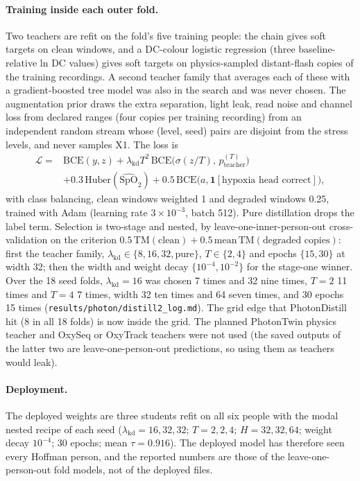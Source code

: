 \paragraph{Training inside each outer fold.} Two teachers are refit on the fold's five training people: the chain gives soft targets on clean windows, and a DC-colour logistic regression (three baseline-relative ln DC values) gives soft targets on physics-sampled distant-flash copies of the training recordings. A second teacher family that averages each of these with a gradient-boosted tree model was also in the search and was never chosen. The augmentation prior draws the extra separation, light leak, read noise and channel loss from declared ranges (four copies per training recording) from an independent random stream whose (level, seed) pairs are disjoint from the stress levels, and never samples X1. The loss is
\begin{equation}
\begin{split}
\mathcal L={}&\mathrm{BCE}(y,z)+\lambda_{\mathrm{kd}}T^2\,\mathrm{BCE}\big(\sigma(z/T),\,p_{\mathrm{teacher}}^{(T)}\big)\\
&+0.3\,\mathrm{Huber}(\widehat{\mathrm{SpO}}_2)+0.5\,\mathrm{BCE}\big(a,\mathbf{1}[\text{hypoxia head correct}]\big),
\end{split}
\end{equation}
with class balancing, clean windows weighted 1 and degraded windows 0.25, trained with Adam \citep{kingma2015adam} (learning rate $3\times10^{-3}$, batch 512). Pure distillation drops the label term. Selection is two-stage and nested, by leave-one-inner-person-out cross-validation on the criterion $0.5\,\mathrm{TM}(\text{clean})+0.5\,\mathrm{mean\,TM}(\text{degraded copies})$: first the teacher family, $\lambda_{\mathrm{kd}}\in\{8,16,32,\text{pure}\}$, $T\in\{2,4\}$ and epochs $\{15,30\}$ at width 32; then the width and weight decay $\{10^{-4},10^{-2}\}$ for the stage-one winner. Over the 18 seed folds, $\lambda_{\mathrm{kd}}=16$ was chosen 7 times and 32 nine times, $T=2$ 11 times and $T=4$ 7 times, width 32 ten times and 64 seven times, and 30 epochs 15 times (\texttt{results/photon/distill2\_log.md}). The grid edge that PhotonDistill hit (8 in all 18 folds) is now inside the grid. The planned PhotonTwin physics teacher and OxySeq or OxyTrack teachers were not used (the saved outputs of the latter two are leave-one-person-out predictions, so using them as teachers would leak).

\paragraph{Deployment.} The deployed weights are three students refit on all six people with the modal nested recipe of each seed ($\lambda_{\mathrm{kd}}=16,32,32$; $T=2,2,4$; $H=32,32,64$; weight decay $10^{-4}$; 30 epochs; mean $\tau=0.916$). The deployed model has therefore seen every Hoffman person, and the reported numbers are those of the leave-one-person-out fold models, not of the deployed files.

